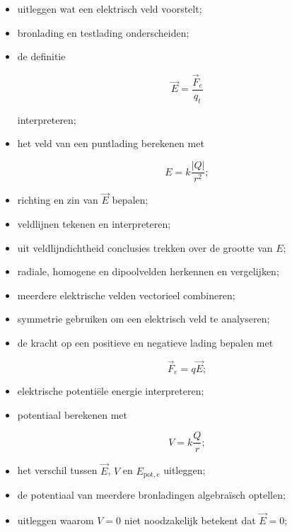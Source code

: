 \documentclass{ximera}
\begin{document}
\begin{itemize}

  \item uitleggen wat een elektrisch veld voorstelt;

  \item bronlading en testlading onderscheiden;

  \item de definitie

        \[
        \vec E=\frac{\vec F_e}{q_t}
        \]

        interpreteren;

  \item het veld van een puntlading berekenen met

        \[
        E=k\frac{|Q|}{r^2};
        \]

  \item richting en zin van $\vec E$ bepalen;

  \item veldlijnen tekenen en interpreteren;

  \item uit veldlijndichtheid conclusies trekken over de grootte van
        $E$;

  \item radiale, homogene en dipoolvelden herkennen en vergelijken;

  \item meerdere elektrische velden vectorieel combineren;

  \item symmetrie gebruiken om een elektrisch veld te analyseren;

  \item de kracht op een positieve en negatieve lading bepalen met

        \[
        \vec F_e=q\vec E;
        \]

  \item elektrische potentiële energie interpreteren;

  \item potentiaal berekenen met

        \[
        V=k\frac{Q}{r};
        \]

  \item het verschil tussen $\vec E$, $V$ en
        $E_{\mathrm{pot,e}}$ uitleggen;

  \item de potentiaal van meerdere bronladingen algebraïsch optellen;

  \item uitleggen waarom $V=0$ niet noodzakelijk betekent dat
        $\vec E=0$;


\end{itemize}
\end{document}
